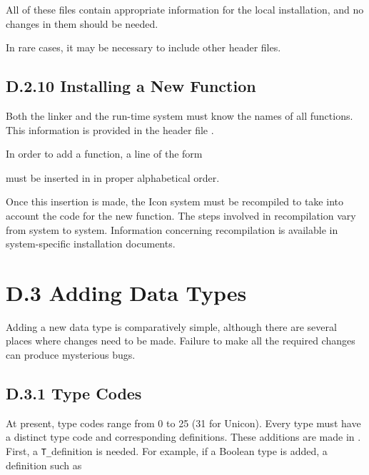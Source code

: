 
\noindent
All of these files contain appropriate information for the local
installation, and no changes in them should be needed.


In rare cases, it may be necessary to include other header files.
%

\subsection[D.2.10 Installing a New Function]{D.2.10 Installing a New Function}

Both the linker and the run-time system must know the names of all
functions. This information is provided in the header file .


In order to add a function, a line of the form

\noindent must be inserted in  in proper alphabetical order.

Once this insertion is made, the Icon system must be recompiled to
take into account the code for the new function. The steps involved in
recompilation vary from system to system. Information concerning
recompilation is available in system-specific installation documents.

\section[D.3 Adding Data Types]{D.3 Adding Data Types}

Adding a new data type is comparatively simple, although there are
several places where changes need to be made. Failure to make all the
required changes can produce mysterious bugs.

\subsection[D.3.1 Type Codes]{D.3.1 Type Codes}

At present, type codes range from 0 to 25 {\color{blue} (31 for
Unicon)}. Every type must have a distinct type code and corresponding
definitions.  These additions are made in . First, a
\texttt{T\_}definition is needed. For example, if a Boolean type is added,
a definition such as

